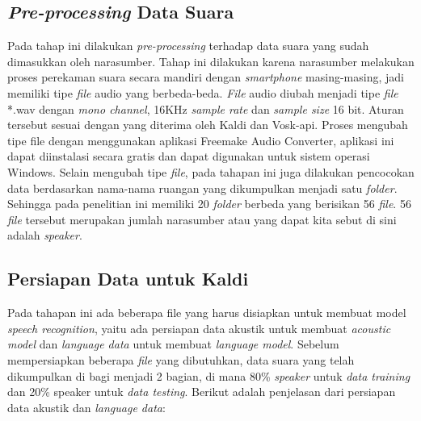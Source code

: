 \subsection{\textit{Pre-processing} Data Suara}
Pada tahap ini dilakukan \textit{pre-processing} terhadap data suara yang sudah dimasukkan oleh narasumber. Tahap ini dilakukan karena narasumber melakukan proses perekaman suara secara mandiri dengan \textit{smartphone} masing-masing, jadi memiliki tipe \textit{file} audio yang berbeda-beda. \textit{File} audio diubah menjadi tipe \textit{file} *.wav dengan \textit{mono channel}, 16KHz \textit{sample rate} dan \textit{sample size} 16 bit. Aturan tersebut sesuai dengan yang diterima oleh Kaldi dan Vosk-api. Proses mengubah tipe file dengan menggunakan aplikasi Freemake Audio Converter, aplikasi ini dapat diinstalasi secara gratis dan dapat digunakan untuk sistem operasi Windows. 
Selain mengubah tipe \textit{file}, pada tahapan ini juga dilakukan pencocokan data berdasarkan nama-nama ruangan yang dikumpulkan menjadi satu \textit{folder}. Sehingga pada penelitian ini memiliki 20 \textit{folder} berbeda yang berisikan 56 \textit{file}. 56 \textit{file} tersebut merupakan jumlah narasumber atau yang dapat kita sebut di sini adalah \textit{speaker}.

\subsection{Persiapan Data untuk Kaldi}
Pada tahapan ini ada beberapa file yang harus disiapkan untuk membuat model \textit{speech recognition}, yaitu ada persiapan data akustik untuk membuat \textit{acoustic model} dan \textit{language data} untuk membuat \textit{language model}. Sebelum mempersiapkan beberapa \textit{file} yang dibutuhkan, data suara yang telah dikumpulkan di bagi menjadi 2 bagian, di mana 80\% \textit{speaker} untuk \textit{data training} dan 20\% speaker untuk \textit{data testing}. Berikut adalah penjelasan dari persiapan data akustik dan \textit{language data}:

